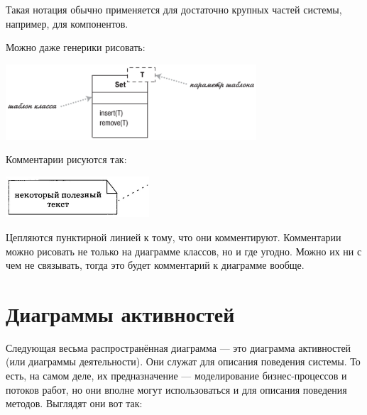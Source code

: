 \documentclass[a5paper]{article}
\begin{document}
Такая нотация обычно применяется для достаточно крупных частей системы, например, для компонентов.

Можно даже генерики рисовать:

\begin{center}
	\includegraphics[width=0.7\textwidth]{templates.png}
\end{center}

Комментарии рисуются так:

\begin{center}
	\includegraphics[width=0.4\textwidth]{comment.png}
\end{center}

Цепляются пунктирной линией к тому, что они комментируют. Комментарии можно рисовать не только на диаграмме классов, но и где угодно. Можно их ни с чем не связывать, тогда это будет комментарий к диаграмме вообще.

\section{Диаграммы активностей}

Следующая весьма распространённая диаграмма --- это диаграмма активностей (или диаграммы деятельности). Они служат для описания поведения системы. То есть, на самом деле, их предназначение --- моделирование бизнес-процессов и потоков работ, но они вполне могут использоваться и для описания поведения методов. Выглядят они вот так:
\end{document}
